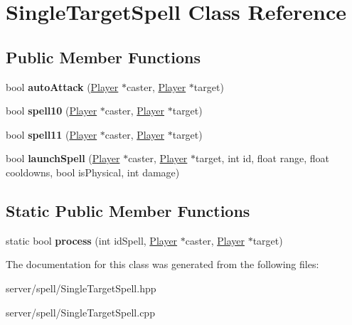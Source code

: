 \hypertarget{class_single_target_spell}{\section{Single\-Target\-Spell Class Reference}
\label{class_single_target_spell}
}
\subsection*{Public Member Functions}
\begin{DoxyCompactItemize}
\item 
\hypertarget{class_single_target_spell_a07895a7218e8babb0bb8cc3e055aa84d}{bool {\bfseries auto\-Attack} (\hyperlink{class_player}{Player} $\ast$caster, \hyperlink{class_player}{Player} $\ast$target)}\label{class_single_target_spell_a07895a7218e8babb0bb8cc3e055aa84d}

\item 
\hypertarget{class_single_target_spell_a9a9222bdc3d3974722235796262de860}{bool {\bfseries spell10} (\hyperlink{class_player}{Player} $\ast$caster, \hyperlink{class_player}{Player} $\ast$target)}\label{class_single_target_spell_a9a9222bdc3d3974722235796262de860}

\item 
\hypertarget{class_single_target_spell_a969c737907fa7a453155b1be4dd98c2a}{bool {\bfseries spell11} (\hyperlink{class_player}{Player} $\ast$caster, \hyperlink{class_player}{Player} $\ast$target)}\label{class_single_target_spell_a969c737907fa7a453155b1be4dd98c2a}

\item 
\hypertarget{class_single_target_spell_ab205daa2d4bcf1d602f2ba063448579b}{bool {\bfseries launch\-Spell} (\hyperlink{class_player}{Player} $\ast$caster, \hyperlink{class_player}{Player} $\ast$target, int id, float range, float cooldowns, bool is\-Physical, int damage)}\label{class_single_target_spell_ab205daa2d4bcf1d602f2ba063448579b}

\end{DoxyCompactItemize}
\subsection*{Static Public Member Functions}
\begin{DoxyCompactItemize}
\item 
\hypertarget{class_single_target_spell_ae3672d93fb396366fca85bf75ceccb6d}{static bool {\bfseries process} (int id\-Spell, \hyperlink{class_player}{Player} $\ast$caster, \hyperlink{class_player}{Player} $\ast$target)}\label{class_single_target_spell_ae3672d93fb396366fca85bf75ceccb6d}

\end{DoxyCompactItemize}


The documentation for this class was generated from the following files\-:\begin{DoxyCompactItemize}
\item 
server/spell/Single\-Target\-Spell.\-hpp\item 
server/spell/Single\-Target\-Spell.\-cpp\end{DoxyCompactItemize}
